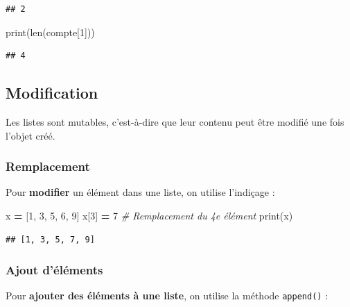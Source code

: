 \documentclass[
  12pt,
]{book}
\newenvironment{Shaded}{\begin{snugshade}}{\end{snugshade}}
\newcommand{\BuiltInTok}[1]{#1}
\newcommand{\CommentTok}[1]{\textcolor[rgb]{0.56,0.35,0.01}{\textit{#1}}}
\newcommand{\DecValTok}[1]{\textcolor[rgb]{0.00,0.00,0.81}{#1}}
\newcommand{\NormalTok}[1]{#1}
\newcommand{\OperatorTok}[1]{\textcolor[rgb]{0.81,0.36,0.00}{\textbf{#1}}}
\numberwithin{equation}{section}
\numberwithin{countremarque}{section}
\begin{document}
\begin{lstlisting}
## 2
\end{lstlisting}

\begin{Shaded}
\begin{Highlighting}[]
\BuiltInTok{print}\NormalTok{(}\BuiltInTok{len}\NormalTok{(compte[}\DecValTok{1}\NormalTok{]))}
\end{Highlighting}
\end{Shaded}

\begin{lstlisting}
## 4
\end{lstlisting}

\subsection{Modification}\label{modification}

Les listes sont mutables, c'est-à-dire que leur contenu peut être modifié une fois l'objet créé.

\subsubsection{Remplacement}\label{remplacement}

Pour \textbf{modifier} un élément dans une liste, on utilise l'indiçage :

\begin{Shaded}
\begin{Highlighting}[]
\NormalTok{x }\OperatorTok{=}\NormalTok{ [}\DecValTok{1}\NormalTok{, }\DecValTok{3}\NormalTok{, }\DecValTok{5}\NormalTok{, }\DecValTok{6}\NormalTok{, }\DecValTok{9}\NormalTok{]}
\NormalTok{x[}\DecValTok{3}\NormalTok{] }\OperatorTok{=} \DecValTok{7} \CommentTok{\# Remplacement du 4e élément}
\BuiltInTok{print}\NormalTok{(x)}
\end{Highlighting}
\end{Shaded}

\begin{lstlisting}
## [1, 3, 5, 7, 9]
\end{lstlisting}

\subsubsection{Ajout d'éléments}\label{ajout-duxe9luxe9ments}

Pour \textbf{ajouter des éléments à une liste}, on utilise la méthode \texttt{append()} :
\end{document}
